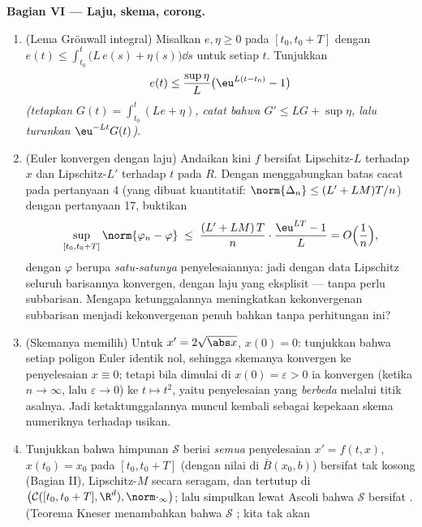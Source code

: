 \begin{problem}[{Soal akhir pekan --- keberadaan penyelesaian
$x' = f(t, x)$ tanpa Lipschitz}]
\medskip
\noindent\textbf{Bagian VI --- Laju, skema, corong.}
\begin{enumerate}[resume]
  \item (Lema Grönwall integral) Misalkan $e, \eta \geq 0$
         pada $[t_0, t_0+T]$ dengan $e(t) \leq \int_{t_0}
        ^t\bigl(L\,e(s) + \eta(s)\bigr)\dd s$ untuk setiap $t$. Tunjukkan
        \[
        e(t) \leq \frac{\sup\eta}{L}\bigl(\eu^{L(t - t_0)} -
        1\bigr)
        \]
        \emph{(tetapkan $G(t) = \int_{t_0}^t(Le + \eta)$, catat bahwa $G'
        \leq LG + \sup\eta$, lalu turunkan
        $\eu^{-Lt}G(t)$)}.
  \item (Euler konvergen dengan laju) Andaikan kini $f$ bersifat
        Lipschitz-$L$ terhadap $x$ dan Lipschitz-$L'$ terhadap $t$ pada $R$.
        Dengan menggabungkan batas cacat pada pertanyaan 4 (yang dibuat
        kuantitatif: $\norm{\Delta_n} \leq (L' + LM)T/n$) dengan
        pertanyaan 17, buktikan
        \[
        \sup_{[t_0, t_0+T]}\norm{\varphi_n - \varphi}
        \;\leq\; \frac{(L' + LM)\,T}{n}\cdot
        \frac{\eu^{LT} - 1}{L} = O\Bigl(\frac1n\Bigr),
        \]
        dengan $\varphi$ berupa \emph{satu-satunya} penyelesaiannya: jadi dengan
        data Lipschitz seluruh barisannya konvergen, dengan laju yang
        eksplisit --- tanpa perlu subbarisan. Mengapa ketunggalannya
        meningkatkan kekonvergenan subbarisan menjadi kekonvergenan penuh
        bahkan tanpa perhitungan ini?
  \item (Skemanya memilih) Untuk $x' = 2\sqrt{\abs x}$, $x(0) =
        0$: tunjukkan bahwa setiap poligon Euler identik nol,
        sehingga skemanya konvergen ke penyelesaian $x \equiv 0$;
        tetapi bila dimulai di $x(0) = \varepsilon > 0$ ia konvergen
        (ketika $n \to \infty$, lalu $\varepsilon \to 0$) ke $t
        \mapsto t^2$, yaitu penyelesaian yang \emph{berbeda} melalui titik
        asalnya. Jadi ketaktunggalannya muncul kembali sebagai kepekaan
        skema numeriknya terhadap usikan.
  \item Tunjukkan bahwa himpunan $\mathcal S$ berisi \emph{semua} penyelesaian
        $x' = f(t,x)$, $x(t_0) = x_0$ pada $[t_0, t_0+T]$
        (dengan nilai di $\bar B(x_0, b)$) bersifat tak kosong (Bagian II),
        Lipschitz-$M$ secara seragam, dan tertutup di
        $\bigl(\mathcal C([t_0, t_0+T], \R^d),
        \norm\cdot_\infty\bigr)$; lalu simpulkan lewat Ascoli bahwa
        $\mathcal S$ bersifat \emph{}. (Teorema Kneser menambahkan
        bahwa $\mathcal S$ ; kita tak akan

\end{enumerate}
\end{problem}

